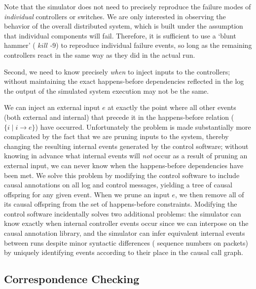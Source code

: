 Note that the simulator does not need
to precisely reproduce the failure modes of {\em individual} controllers or switches.
We are only interested in observing the behavior of the overall distributed system, which is
built under the assumption that individual components will fail.
Therefore, it is sufficient to use a `blunt hammer' (\eg{}
$kill \text{ -}9$) to reproduce individual
failure events, so long as the remaining controllers react in the same
way as they did in the actual run.

Second, we need to know precisely {\em when} to inject inputs to the controllers;
without maintaining the exact happens-before dependencies reflected in the
log the output of the simulated system execution may not be the same.

We can inject an external input $e$ at exactly the point where all other
events (both external and internal) that precede it in the happens-before
relation ($\{i \mid i \rightarrow e\}$) have occurred. Unfortunately the problem is made
substantially more complicated by the fact that we are pruning inputs to the
system, thereby changing the resulting internal events generated by the control
software; without knowing in advance what internal events will {\em not} occur
as a result of pruning an external input, we can never know when the happens-before
dependencies have
been met. We solve this problem by modifying the control software to include causal
annotations on all log and control messages, yielding a tree of
causal offspring for any given event. When we prune an input $e$, we then remove
all of its causal offspring from the set of
happens-before constraints. Modifying the control software incidentally solves two
additional problems: the simulator can know exactly when internal controller events
occur since we can interpose on the causal annotation library, and
the simulator can infer equivalent internal events between runs despite minor
syntactic differences (\eg{} sequence numbers on packets) by
uniquely identifying events according to their place in the causal call graph.


\subsection{Correspondence Checking}

